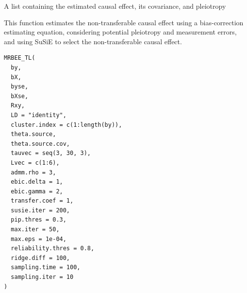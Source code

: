 \documentclass[a4paper]{book}
\begin{document}
%
\begin{Value}
A list containing the estimated causal effect, its covariance, and pleiotropy
\end{Value}
%
\begin{Description}
This function estimates the non-transferable causal effect using a bias-correction estimating equation, considering potential pleiotropy and measurement errors, and using SuSiE to select the non-transferable causal effect.
\end{Description}
%
\begin{Usage}
\begin{verbatim}
MRBEE_TL(
  by,
  bX,
  byse,
  bXse,
  Rxy,
  LD = "identity",
  cluster.index = c(1:length(by)),
  theta.source,
  theta.source.cov,
  tauvec = seq(3, 30, 3),
  Lvec = c(1:6),
  admm.rho = 3,
  ebic.delta = 1,
  ebic.gamma = 2,
  transfer.coef = 1,
  susie.iter = 200,
  pip.thres = 0.3,
  max.iter = 50,
  max.eps = 1e-04,
  reliability.thres = 0.8,
  ridge.diff = 100,
  sampling.time = 100,
  sampling.iter = 10
)
\end{verbatim}
\end{Usage}
%
\end{document}
